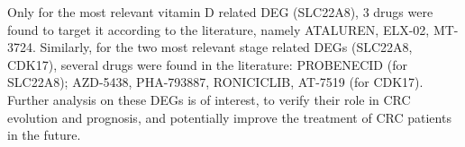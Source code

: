 \documentclass[fleqn,10pt]{SelfArx} %
\begin{document}
	Only for the most relevant vitamin D related DEG (SLC22A8), 3 drugs were found to target it according to the literature, namely ATALUREN, ELX-02, MT-3724. Similarly, for the two most relevant stage related DEGs (SLC22A8, CDK17), several drugs were found in the literature: PROBENECID (for SLC22A8); AZD-5438, PHA-793887, RONICICLIB, AT-7519 (for CDK17). Further analysis on these DEGs is of interest, to verify their role in CRC evolution and prognosis, and potentially improve the treatment of CRC patients in the future.





\end{document}

